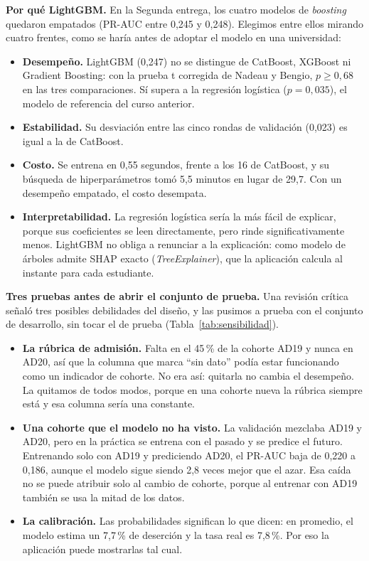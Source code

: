 \documentclass[11pt,a4paper]{article}
\begin{document}
\textbf{Por qué LightGBM.} En la Segunda entrega, los cuatro modelos de \textit{boosting} quedaron empatados (PR-AUC entre 0,245 y 0,248). Elegimos entre ellos mirando cuatro frentes, como se haría antes de adoptar el modelo en una universidad:
\begin{itemize}[leftmargin=1.3em,itemsep=1pt,topsep=2pt]
\item \textbf{Desempeño.} LightGBM (0,247) no se distingue de CatBoost, XGBoost ni Gradient Boosting: con la prueba t corregida de Nadeau y Bengio, $p \geq 0{,}68$ en las tres comparaciones. Sí supera a la regresión logística ($p = 0{,}035$), el modelo de referencia del curso anterior.
\item \textbf{Estabilidad.} Su desviación entre las cinco rondas de validación (0,023) es igual a la de CatBoost.
\item \textbf{Costo.} Se entrena en 0,55 segundos, frente a los 16 de CatBoost, y su búsqueda de hiperparámetros tomó 5,5 minutos en lugar de 29,7. Con un desempeño empatado, el costo desempata.
\item \textbf{Interpretabilidad.} La regresión logística sería la más fácil de explicar, porque sus coeficientes se leen directamente, pero rinde significativamente menos. LightGBM no obliga a renunciar a la explicación: como modelo de árboles admite SHAP exacto (\textit{TreeExplainer}), que la aplicación calcula al instante para cada estudiante.
\end{itemize}

\textbf{Tres pruebas antes de abrir el conjunto de prueba.} Una revisión crítica señaló tres posibles debilidades del diseño, y las pusimos a prueba con el conjunto de desarrollo, sin tocar el de prueba (Tabla~\ref{tab:sensibilidad}).
\begin{itemize}[leftmargin=1.3em,itemsep=1pt,topsep=2pt]
\item \textbf{La rúbrica de admisión.} Falta en el 45\,\% de la cohorte AD19 y nunca en AD20, así que la columna que marca ``sin dato'' podía estar funcionando como un indicador de cohorte. No era así: quitarla no cambia el desempeño. La quitamos de todos modos, porque en una cohorte nueva la rúbrica siempre está y esa columna sería una constante.
\item \textbf{Una cohorte que el modelo no ha visto.} La validación mezclaba AD19 y AD20, pero en la práctica se entrena con el pasado y se predice el futuro. Entrenando solo con AD19 y prediciendo AD20, el PR-AUC baja de 0,220 a 0,186, aunque el modelo sigue siendo 2,8 veces mejor que el azar. Esa caída no se puede atribuir solo al cambio de cohorte, porque al entrenar con AD19 también se usa la mitad de los datos.
\item \textbf{La calibración.} Las probabilidades significan lo que dicen: en promedio, el modelo estima un 7,7\,\% de deserción y la tasa real es 7,8\,\%. Por eso la aplicación puede mostrarlas tal cual.
\end{itemize}
\end{document}
